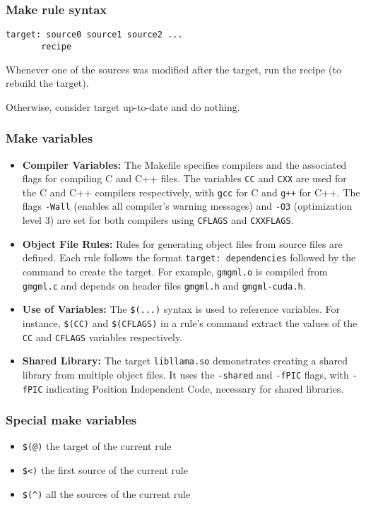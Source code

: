 \documentclass[12pt]{article}
\begin{document}
\subsubsection{Make rule syntax}

\begin{lstlisting}
target: source0 source1 source2 ...
       recipe
\end{lstlisting}

Whenever one of the sources was modified after the target, run the recipe (to rebuild the target).

Otherwise, consider target up-to-date and do nothing.

\subsubsection{Make variables}


\begin{itemize}
    \item \textbf{Compiler Variables:} The Makefile specifies compilers and the associated flags for compiling C and C++ files. The variables \texttt{CC} and \texttt{CXX} are used for the C and C++ compilers respectively, with \texttt{gcc} for C and \texttt{g++} for C++. The flags \texttt{-Wall} (enables all compiler's warning messages) and \texttt{-O3} (optimization level 3) are set for both compilers using \texttt{CFLAGS} and \texttt{CXXFLAGS}.
    \item \textbf{Object File Rules:} Rules for generating object files from source files are defined. Each rule follows the format \texttt{target: dependencies} followed by the command to create the target. For example, \texttt{gmgml.o} is compiled from \texttt{gmgml.c} and depends on header files \texttt{gmgml.h} and \texttt{gmgml-cuda.h}.
    \item \textbf{Use of Variables:} The \texttt{\$(...)} syntax is used to reference variables. For instance, \texttt{\$(CC)} and \texttt{\$(CFLAGS)} in a rule's command extract the values of the \texttt{CC} and \texttt{CFLAGS} variables respectively. 
    \item \textbf{Shared Library:} The target \texttt{libllama.so} demonstrates creating a shared library from multiple object files. It uses the \texttt{-shared} and \texttt{-fPIC} flags, with \texttt{-fPIC} indicating Position Independent Code, necessary for shared libraries.
\end{itemize}



\subsubsection{Special make variables}
\begin{itemize}
    \item \verb|$(@)| the target of the current rule
    \item \verb|$<)| the first source of the current rule
    \item \verb|$(^)| all the sources of the current rule
\end{itemize}
\end{document}
